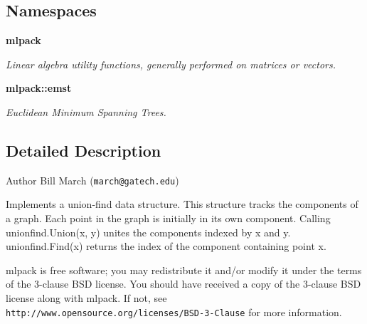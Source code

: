 \subsection*{Namespaces}
\begin{DoxyCompactItemize}
\item 
 {\bf mlpack}
\begin{DoxyCompactList}\small\item\em Linear algebra utility functions, generally performed on matrices or vectors. \end{DoxyCompactList}\item 
 {\bf mlpack\+::emst}
\begin{DoxyCompactList}\small\item\em Euclidean Minimum Spanning Trees. \end{DoxyCompactList}\end{DoxyCompactItemize}


\subsection{Detailed Description}
\begin{DoxyAuthor}{Author}
Bill March ({\tt march@gatech.\+edu})
\end{DoxyAuthor}
Implements a union-\/find data structure. This structure tracks the components of a graph. Each point in the graph is initially in its own component. Calling unionfind.\+Union(x, y) unites the components indexed by x and y. unionfind.\+Find(x) returns the index of the component containing point x.

mlpack is free software; you may redistribute it and/or modify it under the terms of the 3-\/clause B\+SD license. You should have received a copy of the 3-\/clause B\+SD license along with mlpack. If not, see {\tt http\+://www.\+opensource.\+org/licenses/\+B\+S\+D-\/3-\/\+Clause} for more information. 